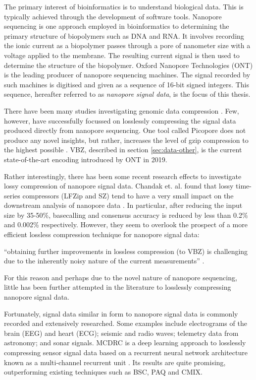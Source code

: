 The primary interest of bioinformatics is to understand biological data. This is typically achieved through the development of software tools. Nanopore sequencing is one approach employed in bioinformatics to determining the primary structure of biopolymers such as DNA and RNA. It involves recording the ionic current as a biopolymer passes through a pore of nanometer size with a voltage applied to the membrane. The resulting current signal is then used to determine the structure of the biopolymer. Oxford Nanopore Technologies (ONT) is the leading producer of nanopore sequencing machines. The signal recorded by such machines is digitised and given as a sequence of 16-bit signed integers. This sequence, hereafter referred to as \textit{nanopore signal data}, is the focus of this thesis.

There have been many studies investigating genomic data compression \cite{genomic-comp}. Few, however, have successfully focussed on losslessly compressing the signal data produced directly from nanopore sequencing. One tool called Picopore does not produce any novel insights, but rather, increases the level of gzip compression to the highest possible \cite{picopore}. VBZ, described in section \ref{sec:data-other}, is the current state-of-the-art encoding introduced by ONT in 2019.

Rather interestingly, there has been some recent research effects to investigate lossy compression of nanopore signal data. Chandak et. al. found that lossy time-series compressors (LFZip and SZ) tend to have a very small impact on the downstream analysis of nanopore data \cite{lossy-nano, lfzip}. In particular, after reducing the input size by 35-50\%, basecalling and consensus accuracy is reduced by less than 0.2\% and 0.002\% respectively. However, they seem to overlook the prospect of a more efficient lossless compression technique for nanopore signal data:
\begin{displayquote}
``obtaining further improvements in lossless compression (to VBZ) is challenging due to the inherently noisy nature of the current measurements'' \cite{lossy-nano}.
\end{displayquote}
For this reason and perhaps due to the novel nature of nanopore sequencing, little has been further attempted in the literature to losslessly compressing nanopore signal data.

Fortunately, signal data similar in form to nanopore signal data is commonly recorded and extensively researched. Some examples include electrograms of the brain (EEG) and heart (ECG); seismic and radio waves; telemetry data from astronomy; and sonar signals. MCDRC is a deep learning approach to losslessly compressing sensor signal data based on a recurrent neural network architecture known as a multi-channel recurrent unit \cite{mcdrc}. Its results are quite promising, outperforming existing techniques such as BSC, PAQ and CMIX.
